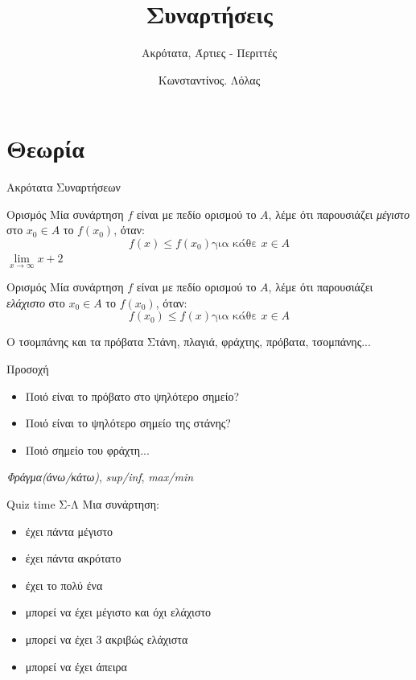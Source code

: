 \documentclass{presentation}
\title{Συναρτήσεις}
\subtitle{Ακρότατα, Άρτιες - Περιττές}
\author[Λόλας]{Κωνσταντίνος. Λόλας}
\date{}
\begin{document}
\begin{frame}
      \titlepage
\end{frame}

\section{Θεωρία}
\begin{frame}{Ακρότατα Συναρτήσεων}
      \begin{block}{Ορισμός}
            Μία συνάρτηση $f$ είναι με πεδίο ορισμού το $Α$, λέμε ότι παρουσιάζει \emph{μέγιστο} στο $x_0\in Α$ το $f(x_0)$, όταν:
            $$f(x)\le f(x_0)\text{για κάθε } x\in Α$$
            $\lim\limits_{x \to \infty}{ x+2 }$
      \end{block} \pause
      \begin{block}{Ορισμός}
            Μία συνάρτηση $f$ είναι με πεδίο ορισμού το $Α$, λέμε ότι παρουσιάζει \emph{ελάχιστο} στο $x_0\in Α$ το $f(x_0)$, όταν:
            $$f(x_0)\le f(x)\text{για κάθε } x\in Α$$
      \end{block}
\end{frame}

\begin{frame}{Ο τσομπάνης και τα πρόβατα}
      Στάνη, πλαγιά, φράχτης, πρόβατα, τσομπάνης... \pause
      \begin{alertblock}{Προσοχή}
            \begin{itemize}
                  \item Ποιό είναι το πρόβατο στο ψηλότερο σημείο?
                  \item Ποιό είναι το ψηλότερο σημείο της στάνης?
                  \item Ποιό σημείο του φράχτη...
            \end{itemize}
      \end{alertblock}
      \emph{Φράγμα(άνω/κάτω)}, \emph{sup/inf}, \emph{max/min}
\end{frame}

\begin{frame}{Quiz time Σ-Λ}
      Μια συνάρτηση:
      \begin{itemize}
            \item έχει πάντα μέγιστο\pause
            \item έχει πάντα ακρότατο\pause
            \item έχει το πολύ ένα \pause
            \item μπορεί να έχει μέγιστο και όχι ελάχιστο \pause
            \item μπορεί να έχει 3 ακριβώς ελάχιστα \pause
            \item μπορεί να έχει άπειρα
      \end{itemize}
\end{frame}
\end{document}
